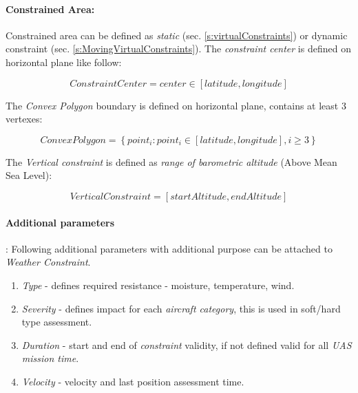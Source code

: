 \paragraph{Constrained Area:} Constrained area can be defined as \emph{static} (sec. \ref{s:virtualConstraints}) or dynamic constraint (sec. \ref{s:MovingVirtualConstraints}).  The \emph{constraint center} is defined on horizontal plane like follow:

\begin{equation}
    Constraint Center = center \in \left [latitude, longitude\right]
\end{equation}

\noindent The \emph{Convex Polygon} boundary is defined on horizontal plane, contains at least 3 vertexes:

\begin{equation}
    Convex Polygon = \left\{point_i:point_i\in \left [latitude, longitude\right], i \ge 3\right\}
\end{equation}

\noindent The \emph{Vertical constraint} is defined as \emph{range of barometric altitude} (Above Mean Sea Level):

\begin{equation}
    Vertical Constraint = \left [ start Altitude, end Altitude \right ]
\end{equation}

\paragraph{Additional parameters}: Following additional parameters with additional purpose can be attached to \emph{Weather Constraint}.
\begin{enumerate}
    \item \emph{Type} - defines required resistance - moisture, temperature, wind.
    
    \item \emph{Severity} - defines impact for each \emph{aircraft category}, this is used in soft/hard type assessment. 
    
    \item \emph{Duration} - start and end of \emph{constraint} validity, if not defined valid for all \emph{UAS mission time}.
    
    \item \emph{Velocity} - velocity and last position assessment time.
\end{enumerate}

